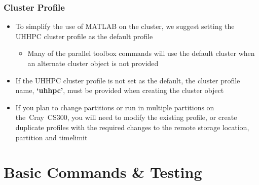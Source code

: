 \documentclass[t]{beamer}
\newcommand{\CNAME}{the~Cray~CS300}
\begin{document}
\begin{frame}
  \frametitle{Cluster Profile}
	\begin{itemize}
	\item To simplify the use of MATLAB on the cluster, we suggest setting the UHHPC cluster profile as the default profile
	\begin{itemize}
		\item Many of the parallel toolbox commands will use the default cluster when an alternate cluster object is not provided
	\end{itemize}
	\item If the UHHPC cluster profile is not set as the default, the cluster profile name, \textbf{`uhhpc'}, must be provided when creating the cluster object
	\item If you plan to change partitions or run in multiple partitions on \CNAME, you will need to modify the existing profile, or create duplicate profiles with the required changes to the remote storage location, partition and timelimit
	\end{itemize}
	
\end{frame}

\section{Basic Commands \& Testing}
\end{document}
